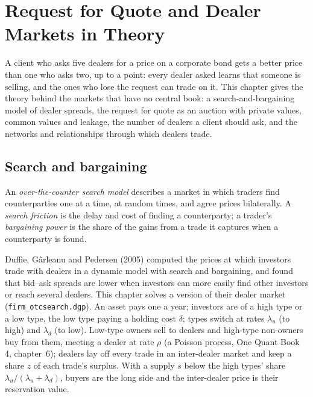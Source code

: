 \chapter{Request for Quote and Dealer Markets in Theory}\label{ch:mx:request-for-quote-and-dealer-markets-in-theory}

A client who asks five dealers for a price on a corporate bond gets a better price than one who asks two, up to a point: every dealer asked learns
that someone is selling, and the ones who lose the request can trade on it. This chapter gives the theory behind the markets that have no central
book: a search-and-bargaining model of dealer spreads, the request for quote as an auction with private values, common values and leakage, the
number of dealers a client should ask, and the networks and relationships through which dealers trade.

\section{Search and bargaining}

\begin{definition}\label{def:mx:request-for-quote-and-dealer-markets-in-theory:search}
An \emph{over-the-counter search model} describes a market in which traders find counterparties one at a time,
at random times, and agree prices bilaterally. A \emph{search friction} is the delay and cost of finding a counterparty; a
trader's \emph{bargaining power} is the share of the gains from a trade it captures when a counterparty is found.
\end{definition}

Duffie, Gârleanu and Pedersen (2005) computed the prices at which investors trade with dealers in a dynamic model with search and bargaining, and found
that bid--ask spreads are lower when investors can more easily find other investors or reach several dealers. This chapter solves a version of their
dealer market (\texttt{firm\_otcsearch.dgp}). An asset pays one a year; investors are of a high type or a low type, the low type paying a holding cost
$\delta$; types switch at rates $\lambda_u$ (to high) and $\lambda_d$ (to low). Low-type owners sell to dealers and high-type non-owners buy from them,
meeting a dealer at rate $\rho$ (a Poisson process, One Quant Book 4, chapter~6); dealers lay off every trade in an inter-dealer market and keep a
share $z$ of each trade's surplus. With a supply $s$ below the high types' share $\lambda_u/(\lambda_u+\lambda_d)$, buyers are the long side and the
inter-dealer price is their reservation value.

